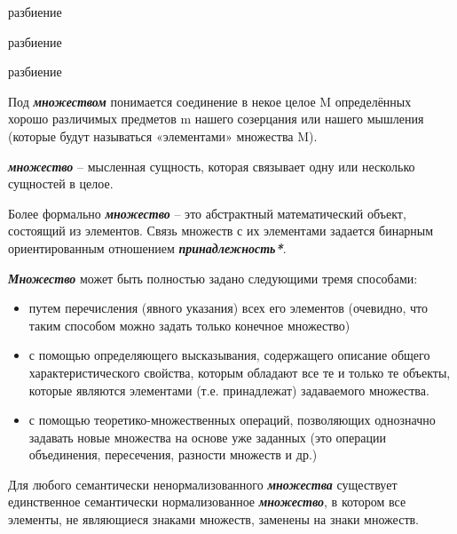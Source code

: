 \begin{SCn}
\begin{scnrelfromset}{разбиение}
\end{scnrelfromset}

\begin{scnrelfromset}{разбиение}
\end{scnrelfromset}

\begin{scnrelfromset}{разбиение}
\end{scnrelfromset}

\end{SCn}

Под \textbf{\textit{множеством}} понимается соединение в некое целое M определённых хорошо различимых предметов m нашего созерцания или нашего мышления (которые будут называться «элементами» множества M). 
	
\textbf{\textit{множество}} – мысленная сущность, которая связывает одну или несколько сущностей в целое.
	
Более формально \textbf{\textit{множество}} – это абстрактный математический объект, состоящий из элементов. Связь множеств с их элементами задается бинарным ориентированным отношением \textbf{\textit{принадлежность*}}.

\textbf{\textit{Множество}} может быть полностью задано следующими тремя способами:

\begin{itemize}
		\item путем перечисления (явного указания) всех его элементов (очевидно, что таким способом можно задать только конечное множество)
		\item с помощью определяющего высказывания, содержащего описание общего характеристического свойства, которым обладают все те и только те объекты, которые являются элементами (т.е. принадлежат) задаваемого множества.
		\item с помощью теоретико-множественных операций, позволяющих однозначно задавать новые множества на основе уже заданных (это операции объединения, пересечения, разности множеств и др.)
\end{itemize}

Для любого семантически ненормализованного \textbf{\textit{множества}} существует единственное семантически нормализованное \textbf{\textit{множество}}, в котором все элементы, не являющиеся знаками множеств, заменены на знаки множеств.

